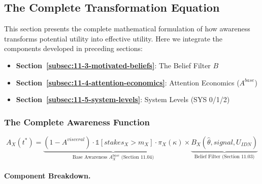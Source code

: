 \subsection{The Complete Transformation Equation}
\label{subsec:11-8-transformation-equation}


This section presents the complete mathematical formulation of how awareness
transforms potential utility into effective utility. Here we integrate the
components developed in preceding sections:

\begin{itemize}
\item \textbf{Section~\ref{subsec:11-3-motivated-beliefs}}: The Belief Filter $B$
\item \textbf{Section~\ref{subsec:11-4-attention-economics}}: Attention Economics ($A^{base}$)
\item \textbf{Section~\ref{subsec:11-5-system-levels}}: System Levels (SYS 0/1/2)
\end{itemize}

\subsubsection{The Complete Awareness Function}
\label{subsubsec:complete-awareness-function}

\begin{tcolorbox}[colback=blue!5!white, colframe=blue!75!black, title=The Complete Awareness Function]
\begin{equation}
\boxed{
A_X(t^*) = \underbrace{(1 - A^{visceral}) \cdot \mathbb{1}[stakes_X > m_X] \cdot \pi_X(\kappa)}_{\text{Base Awareness } A^{base}_X \text{ (Section 11.04)}} \times \underbrace{B_X(\hat{\theta}, signal, U_{IDN})}_{\text{Belief Filter (Section 11.03)}}
}
\label{eq:complete-awareness-function}
\end{equation}
\end{tcolorbox}

\paragraph{Component Breakdown.}

